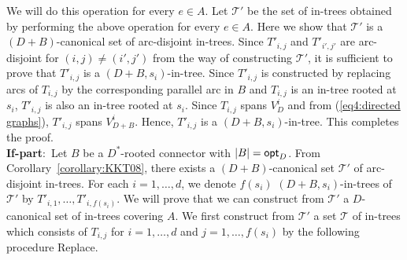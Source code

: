 \documentclass[11pt]{article}
\newcounter{ni}
\theoremstyle{plain}
\newcommand{\eop}{\hfill \usebox{\ProofSym}}
\newenvironment{proof}{\noindent {\it Proof.}}{\eop\par\vspace{0.3cm}}
\begin{document}
\begin{proof}
We will do this operation for every $e \in A$.
Let $\mathcal{T}'$ be the set of in-trees obtained by performing the above operation for every $e \in A$. 
Here we show that $\mathcal{T}'$ is a $(D+B)$-canonical set of arc-disjoint in-trees. 
Since $T'_{i,j}$ and $T'_{i',j'}$ are arc-disjoint for $(i,j)\neq (i',j')$ 
from the way of constructing $\mathcal{T}'$, 
it is sufficient to prove that $T'_{i,j}$ is a $(D+B,s_i)$-in-tree. 
Since $T'_{i,j}$ is constructed by replacing arcs of $T_{i,j}$ by 
the corresponding parallel arc in $B$ and 
$T_{i,j}$ is an in-tree rooted at $s_i$,  
$T'_{i,j}$ is also an in-tree rooted at $s_i$. Since $T_{i,j}$ spans $V^i_D$ and from (\ref{eq4:directed graphs}), 
$T'_{i,j}$ spans $V^i_{D+B}$. Hence, $T'_{i,j}$ 
is a $(D+B,s_i)$-in-tree. This completes the proof. \\
{\bf If-part$\colon$}
Let $B$ be a $D^{\ast}$-rooted connector with $|B|={\sf opt}_D$. 
From Corollary~\ref{corollary:KKT08}, there exists a $(D+B)$-canonical set $\mathcal{T}'$ of arc-disjoint 
in-trees. For each $i=1,\ldots,d$, we denote $f(s_i)$ $(D+B,s_i)$-in-trees of $\mathcal{T}'$ 
by $T'_{i,1},\ldots,T'_{i,f(s_i)}$.
We will prove that we can construct from $\mathcal{T}'$ 
a $D$-canonical set of in-trees covering $A$. 
We first construct from $\mathcal{T}'$ a set $\mathcal{T}$ of in-trees which consists of $T_{i,j}$ for $i=1,\ldots,d$
and $j=1,\ldots,f(s_i)$ by the following procedure {\sf Replace}.
\begin{center}
\end{center}


\end{proof}
\end{document}
